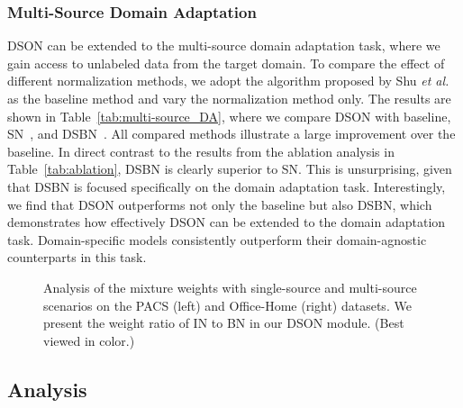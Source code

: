 \documentclass[runningheads]{llncs}
\newcommand\etal{\textit{et al.}}
\begin{document}
\subsubsection{Multi-Source Domain Adaptation}
DSON can be extended to the multi-source domain adaptation task, where we gain access to unlabeled data from the target domain. 
{
To compare the effect of different normalization methods, we adopt the algorithm proposed by Shu \etal~\cite{shu2019transferable} as the baseline method and vary the normalization method only.}
The results are shown in Table~\ref{tab:multi-source_DA}, where we compare DSON with baseline, SN~\cite{sn}, and DSBN~\cite{dsbn}. 
All compared methods illustrate a large improvement over the baseline. 
In direct contrast to the results from the ablation analysis in Table~\ref{tab:ablation}, DSBN is clearly superior to SN. 
This is unsurprising, given that DSBN is focused specifically on the domain adaptation task. 
Interestingly, we find that DSON outperforms not only the baseline but also DSBN, which demonstrates how effectively DSON can be extended to the domain adaptation task.
Domain-specific models consistently outperform their domain-agnostic counterparts in this task.


\begin{figure}[t]
\begin{center}
	\hspace{0.3cm}
	\caption{Analysis of the mixture weights with single-source and multi-source scenarios on the PACS (left) and Office-Home (right) datasets. 
	We present the weight ratio of IN to BN in our DSON module.
	(Best viewed in color.)}
	\label{fig:inbn}
\end{center}
\end{figure}


\subsection{Analysis}
\end{document}
